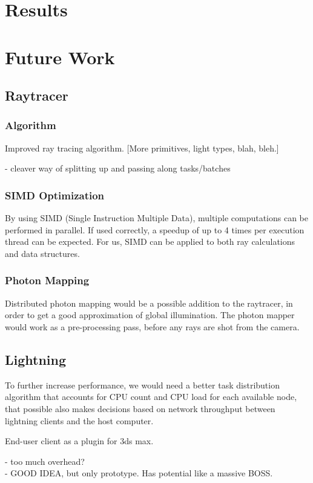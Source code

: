 \chapter{Results}

\chapter{Future Work}
\section{Raytracer}
\subsection{Algorithm}
Improved ray tracing algorithm. [More primitives, light types, blah, bleh.]

- cleaver way of splitting up and passing along tasks/batches\\
\subsection{SIMD Optimization}
By using SIMD (Single Instruction Multiple Data), multiple computations can be performed in parallel. If used correctly, a speedup of up to 4 times per execution thread can be expected. For us, SIMD can be applied to both ray calculations and data structures.

\subsection{Photon Mapping}
Distributed photon mapping would be a possible addition to the raytracer, in order to get a good approximation of global illumination. The photon mapper would work as a pre-processing pass, before any rays are shot from the camera.

\section{Lightning}
To further increase performance, we would need a better task distribution algorithm that accounts for CPU count and CPU load for each available node, that possible also makes decisions based on network throughput between lightning clients and the host computer.

End-user client as a plugin for 3ds max.

- too much overhead?\\
- GOOD IDEA, but only prototype. Has potential like a massive BOSS.